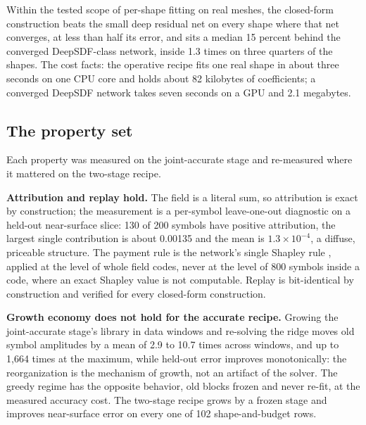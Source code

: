 \documentclass[11pt]{article}
\begin{document}
Within the tested scope of per-shape fitting on real meshes, the
closed-form construction beats the small deep residual net on every
shape where that net converges, at less than half its error, and
sits a median 15 percent behind the converged DeepSDF-class
network, inside 1.3 times on three quarters of the shapes. The cost
facts: the operative recipe fits one real shape in about three
seconds on one CPU core and holds about 82 kilobytes of
coefficients; a converged DeepSDF network takes seven seconds on a
GPU and 2.1 megabytes.

\subsection{The property set}

Each property was measured on the joint-accurate stage and re-measured
where it mattered on the two-stage recipe.

\textbf{Attribution and replay hold.} The field is a literal sum,
so attribution is exact by construction; the measurement is a
per-symbol leave-one-out diagnostic on a held-out near-surface
slice: 130 of 200 symbols have positive attribution, the largest
single contribution is about 0.00135 and the mean is
$1.3\times10^{-4}$, a diffuse, priceable structure. The payment
rule is the network's single Shapley rule \cite{shapley1953},
applied at the level of whole field codes, never at the level of
800 symbols inside a code, where an exact Shapley value is not
computable. Replay is bit-identical by construction and verified
for every closed-form construction.

\textbf{Growth economy does not hold for the accurate recipe.}
Growing the joint-accurate stage's library in data windows and re-solving the ridge
moves old symbol amplitudes by a mean of 2.9 to 10.7 times across
windows, and up to 1{,}664 times at the maximum, while held-out
error improves monotonically: the reorganization is the mechanism
of growth, not an artifact of the solver. The greedy regime has the
opposite behavior, old blocks frozen and never re-fit, at the
measured accuracy cost. The two-stage recipe grows by a frozen
stage and improves near-surface error on every one of 102
shape-and-budget rows.
\end{document}
